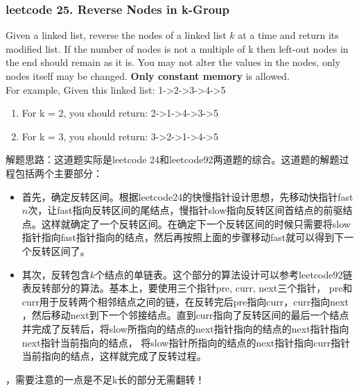 \documentclass[a4paper,10pt]{article}
\begin{document}
\subsubsection{leetcode 25. Reverse Nodes in k-Group}
Given a linked list, reverse the nodes of a linked list $k$ at a time and return its modified list. If the number of nodes is not a multiple of k then left-out nodes in the end should remain as it is. You may not alter the values in the nodes, only nodes itself may be changed. \textbf{Only constant memory} is allowed. \\

\noindent For example, Given this linked list: 1->2->3->4->5
\begin{enumerate}
    \item For k = 2, you should return: 2->1->4->3->5
    \item For k = 3, you should return: 3->2->1->4->5 \\
\end{enumerate}

\begin{CJK*}{UTF8}{gbsn}
\noindent 解题思路：这道题实际是leetcode 24和leetcode92两道题的综合。这道题的解题过程包括两个主要部分：
\begin{itemize}
    \item 首先，确定反转区间。根据leetcode24的快慢指针设计思想，先移动快指针fast$n$次，让fast指向反转区间的尾结点，慢指针slow指向反转区间首结点的前驱结点。这样就确定了一个反转区间。在确定下一个反转区间的时候只需要将slow指针指向fast指针指向的结点，然后再按照上面的步骤移动fast就可以得到下一个反转区间了。
    \item 其次，反转包含$k$个结点的单链表。这个部分的算法设计可以参考leetcode92链表反转部分的算法。基本上，要使用三个指针pre, curr, next三个指针， pre和curr用于反转两个相邻结点之间的链，在反转完后pre指向curr，curr指向next
    ，然后移动next到下一个邻接结点。直到curr指向了反转区间的最后一个结点并完成了反转后，将slow所指向的结点的next指针指向的结点的next指针指向next指针当前指向的结点， 将slow指针所指向的结点的next指针指向curr指针当前指向的结点，这样就完成了反转过程。
\end{itemize}
，需要注意的一点是不足k长的部分无需翻转！
\end{CJK*}
\end{document}
